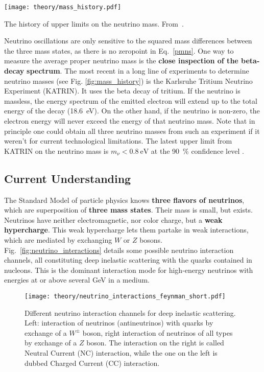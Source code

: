 \begin{marginfigure}
    \texttt{[image: theory/mass\_history.pdf]}
    \caption[Neutrino mass upper limit history]{The history of upper limits on the neutrino mass. From~\cite{Aker2022}.}
\end{marginfigure}

Neutrino oscillations are only sensitive to the squared mass differences between the three mass states, as there is no zeropoint in Eq.~\ref{pmns}. One way to measure the average proper neutrino mass is the \textbf{close inspection of the beta-decay} \textbf{spectrum}. The most recent in a long line of experiments to determine neutrino masses (see Fig. \ref{fig:mass_history}) is the Karlsruhe Tritium Neutrino Experiment (KATRIN). It uses the beta decay of tritium. If the neutrino is massless, the energy spectrum of the emitted electron will extend up to the total energy of the decay (\SI{18.6}{\eV}). On the other hand, if the neutrino is non-zero, the electron energy will never exceed the energy of that neutrino mass. Note that in principle one could obtain all three neutrino masses from such an experiment if it weren't for current technological limitations. The latest upper limit from KATRIN on the neutrino mass is $m_\nu < \SI{0.8}{\eV}$ at the \SI{90}{\percent} confidence level .


\subsection{Current Understanding}\label{neutrinos_current}
The Standard Model of particle physics knows \textbf{three flavors of neutrinos}, which are superposition of \textbf{three mass states}. Their mass is small, but exists. Neutrinos have neither electromagnetic, nor color charge, but a \textbf{weak hypercharge}. This weak hypercharge lets them partake in weak interactions, which are mediated by exchanging $W$ or $Z$ bosons. Fig.~\ref{fig:neutrino_interactions} details some possible neutrino interaction channels, all constituting deep inelastic scattering with the quarks contained in nucleons. This is the dominant interaction mode for high-energy neutrinos with energies at or above several \unit{\giga\eV} in a medium.

\begin{figure}[htb]
    \texttt{[image: theory/neutrino\_interactions\_feynman\_short.pdf]}
    \caption[Neutrino interactions]{Different neutrino interaction channels for deep inelastic scattering. Left: interaction of neutrinos (antineutrinos) with quarks by exchange of a $W^{\pm}$ boson, right interaction of neutrinos of all types by exchange of a $Z$ boson. The interaction on the right is called Neutral Current (NC) interaction, while the one on the left is dubbed Charged Current (CC) interaction.}
\end{figure}

